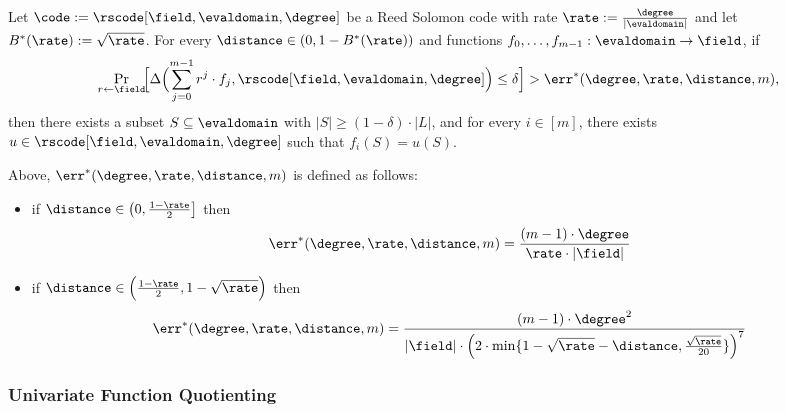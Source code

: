 \begin{theorem}\label{thm:proximity_gap}
    Let $\code := \rscode[\field,\evaldomain,\degree]$ be a Reed Solomon code with rate $\rate:=\frac{\degree}{|\evaldomain|}$ and let $B^*(\rate):=\sqrt{\rate}$. For every $\distance \in (0,1 - B^*(\rate))$ and functions $f_0,\ldots,f_{m-1} : \evaldomain \to \field$, if
    \[
    \Pr_{r\leftarrow\field}\!\Bigl[
      \Delta\Bigl(\sum_{j=0}^{m-1} r^j\cdot {f_j},\rscode[\field,\evaldomain,\degree]\Bigr)
      \le \delta
    \Bigr]>\err^*(\degree,\rate,\distance,m),
    \]
    then there exists a subset $S \subseteq \evaldomain$ with $|S| \ge (1 - \delta)\cdot|L|$,
    and for every $i \in [m]$, there exists $u \in \rscode[\field,\evaldomain,\degree]$ such that $f_i(S) = u(S)$.

    \medskip

    \noindent
    Above, $\err^*(\degree,\rate,\distance,m)$ is defined as follows:
    \begin{itemize}
        \item if $\distance \in \left(0,\frac{1-\rate}{2}\right]$ then
            \[
                \err^*(\degree,\rate,\distance,m)=\frac{(m-1)\cdot \degree}{\rate\cdot|\field|}
            \]
        \item if $\distance \in \Bigl(\frac{1-\rate}{2}, 1-\sqrt{\rate}\Bigr)$ then
        \[
            \err^*(\degree,\rate,\distance,m)=\frac{(m-1)\cdot {\degree}^2}{|\field|\cdot{\Bigl(2\cdot\min\{1-\sqrt{\rate}-\distance,\frac{\sqrt{\rate}}{20}\}\Bigr)}^7}
        \]
    \end{itemize}
\end{theorem}

\subsubsection{Univariate Function Quotienting}\label{sec:quotienting}

